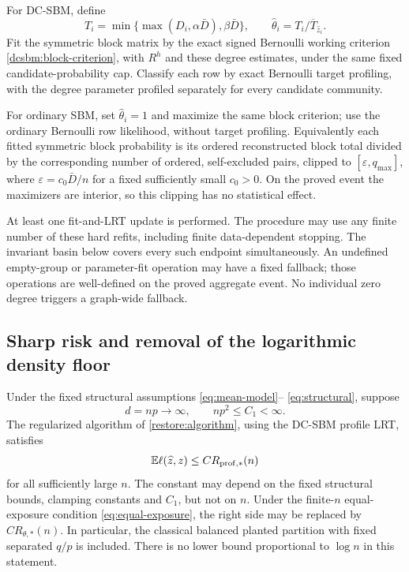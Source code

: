 For DC-SBM, define
\[
 T_i=\min\{\max(D_i,\alpha\bar D),\beta\bar D\},\qquad
 \widehat\theta_i=T_i/\overline T_{\widehat z_i}.
\]
Fit the symmetric block matrix by the exact signed Bernoulli working
criterion \eqref{dcsbm:block-criterion}, with $R^h$ and these degree
estimates, under the same fixed candidate-probability cap. Classify each
row by exact Bernoulli target profiling, with the degree parameter
profiled separately for every candidate community.

For ordinary SBM, set $\widehat\theta_i=1$ and maximize the same block
criterion; use the ordinary Bernoulli row likelihood, without target
profiling. Equivalently each fitted symmetric block probability is its
ordered reconstructed block total divided by the corresponding number
of ordered, self-excluded pairs, clipped to
$[\varepsilon,q_{\max}]$, where
$\varepsilon=c_0\bar D/n$ for a fixed sufficiently small $c_0>0$.
On the proved event the maximizers are interior, so this clipping has
no statistical effect.

At least one fit-and-LRT update is performed. The procedure may use any
finite number of these hard refits, including finite data-dependent
stopping. The invariant basin below covers every such endpoint
simultaneously. An undefined empty-group or parameter-fit operation may
have a fixed fallback; those operations are well-defined on the proved
aggregate event. No individual zero degree triggers a graph-wide fallback.





\subsection{Sharp risk and removal of the logarithmic density floor}

\begin{theorem}\label{restore:dc-theorem}
Under the fixed structural assumptions \eqref{eq:mean-model}--%
\eqref{eq:structural}, suppose
\[
 d=np\longrightarrow\infty,\qquad np^2\le C_1<\infty.
\]
The regularized algorithm of \cref{restore:algorithm}, using the
DC-SBM profile LRT, satisfies
\[
 \mathbb E\ell(\widehat z,z)\le C R_{\mathrm{prof},*}(n)
\]
for all sufficiently large $n$. The constant may depend on the fixed
structural bounds, clamping constants and $C_1$, but not on $n$.
Under the finite-$n$ equal-exposure condition
\eqref{eq:equal-exposure}, the right side may be replaced by
$C R_{\theta,*}(n)$. In particular, the classical balanced planted
partition with fixed separated $q/p$ is included. There is no lower
bound proportional to $\log n$ in this statement.
\end{theorem}

